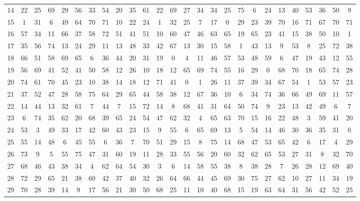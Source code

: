 \begin{table}
\begin{tabular}{c c c c c c c c c c c c c c c c c c c c c c c c c c }
14 & 22 & 25 & 69 & 29 & 56 & 33 & 54 & 20 & 35 & 61 & 22 & 69 & 27 & 34 & 34 & 25 & 75 & 6 & 24 & 13 & 40 & 53 & 36 & 50 & 9 \\
15 & 1 & 31 & 6 & 49 & 64 & 70 & 71 & 10 & 22 & 24 & 1 & 32 & 25 & 7 & 17 & 0 & 29 & 23 & 39 & 70 & 16 & 71 & 67 & 70 & 71 \\
16 & 57 & 34 & 11 & 66 & 37 & 58 & 72 & 51 & 41 & 51 & 10 & 60 & 47 & 46 & 63 & 65 & 19 & 65 & 23 & 41 & 15 & 38 & 50 & 10 & 1 \\
17 & 35 & 56 & 74 & 13 & 24 & 29 & 11 & 13 & 48 & 33 & 42 & 67 & 13 & 30 & 15 & 58 & 1 & 43 & 13 & 9 & 53 & 8 & 25 & 72 & 38 \\
18 & 66 & 51 & 58 & 69 & 65 & 6 & 36 & 44 & 20 & 31 & 19 & 0 & 4 & 11 & 46 & 57 & 53 & 48 & 59 & 6 & 47 & 19 & 43 & 12 & 55 \\
19 & 56 & 69 & 41 & 52 & 41 & 50 & 58 & 12 & 26 & 10 & 18 & 12 & 65 & 69 & 74 & 55 & 16 & 29 & 0 & 68 & 70 & 18 & 65 & 74 & 28 \\
20 & 74 & 61 & 70 & 45 & 23 & 10 & 38 & 14 & 18 & 12 & 71 & 41 & 0 & 1 & 26 & 11 & 37 & 39 & 34 & 67 & 54 & 1 & 53 & 57 & 23 \\
21 & 37 & 52 & 47 & 28 & 58 & 75 & 64 & 29 & 65 & 44 & 58 & 38 & 12 & 67 & 36 & 10 & 6 & 34 & 74 & 36 & 66 & 49 & 69 & 11 & 57 \\
22 & 14 & 44 & 13 & 32 & 61 & 7 & 44 & 7 & 15 & 72 & 14 & 8 & 68 & 41 & 31 & 64 & 50 & 74 & 9 & 23 & 13 & 42 & 49 & 6 & 7 \\
23 & 6 & 74 & 35 & 62 & 20 & 68 & 39 & 65 & 24 & 54 & 47 & 62 & 32 & 4 & 65 & 63 & 70 & 15 & 16 & 22 & 48 & 3 & 59 & 41 & 20 \\
24 & 53 & 3 & 49 & 33 & 17 & 42 & 60 & 43 & 23 & 15 & 9 & 55 & 6 & 65 & 69 & 13 & 5 & 54 & 14 & 46 & 30 & 36 & 35 & 31 & 0 \\
25 & 55 & 14 & 48 & 6 & 45 & 55 & 6 & 36 & 7 & 70 & 51 & 29 & 15 & 8 & 75 & 14 & 68 & 47 & 53 & 65 & 42 & 6 & 17 & 4 & 29 \\
26 & 73 & 9 & 5 & 55 & 75 & 47 & 31 & 60 & 19 & 11 & 28 & 33 & 55 & 56 & 20 & 60 & 32 & 62 & 65 & 53 & 27 & 31 & 8 & 32 & 70 \\
27 & 68 & 46 & 43 & 38 & 34 & 4 & 62 & 64 & 54 & 30 & 3 & 6 & 14 & 58 & 55 & 38 & 8 & 38 & 28 & 7 & 26 & 28 & 12 & 69 & 40 \\
28 & 72 & 29 & 65 & 21 & 38 & 60 & 42 & 37 & 40 & 32 & 26 & 64 & 66 & 44 & 45 & 69 & 30 & 75 & 27 & 62 & 10 & 27 & 11 & 34 & 19 \\
29 & 70 & 28 & 39 & 14 & 9 & 17 & 56 & 21 & 30 & 50 & 68 & 25 & 11 & 10 & 40 & 68 & 15 & 19 & 63 & 64 & 31 & 56 & 42 & 52 & 25 \\

\end{tabular}
\end{table}
